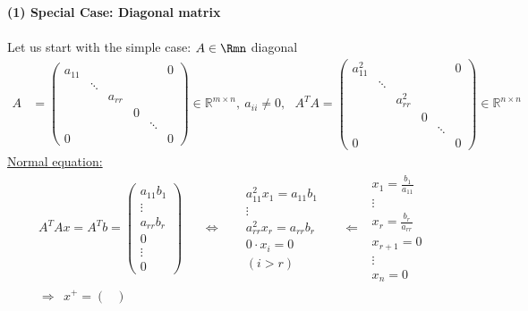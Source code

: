 {\color{solution}
	\textbf{(1) Special Case: Diagonal matrix}\\~\\
	Let us start with the simple case: $A\in \Rmn $ diagonal
	\begin{align*}
	A&=\begin{pmatrix}
	a_{11}&~&~&~&~&0\\
	~&\ddots&~&~&~&~\\
	~&~&a_{rr}&~&~&~\\
	~&~&~&0&~&~\\
	~&~&~&~&\ddots&~\\
	0&~&~&~&~&0
	\end{pmatrix}\in\mathbb{R}^{m\times n},~a_{ii}\neq 0,~~~A^TA=\begin{pmatrix}
	a_{11}^2&~&~&~&~&0\\
	~&\ddots&~&~&~&~\\
	~&~&a_{rr}^2&~&~&~\\
	~&~&~&0&~&~\\
	~&~&~&~&\ddots&~\\
	0&~&~&~&~&0
	\end{pmatrix}\in\mathbb{R}^{n\times n}
	\end{align*}
	\small
	\underline{Normal equation:}
	\begin{align*}
	A^TAx=A^Tb=\begin{pmatrix}
	a_{11}b_1\\\vdots\\a_{rr}b_r\\0\\\vdots\\0
	\end{pmatrix}~~
	~~~~~	\Leftrightarrow~~~~~~~\begin{matrix}
	a_{11}^2x_1=a_{11}b_1\\
	\vdots\\
	a_{rr}^2x_r=a_{rr}b_r\\
	0\cdot x_i=0\\
	{(i> r)}
	\end{matrix}~~
	~~~~~	\Leftarrow~~\begin{matrix}
	x_1=\frac{b_1}{a_{11}}\\
	\vdots\\
	x_r=\frac{b_r}{a_{rr}}\\
	x_{r+1}=0\\
	\vdots\\
	x_n=0
	\end{matrix}\\
	\Rightarrow~~x^+=\begin{pmatrix}

\end{pmatrix}
\end{align*}}
